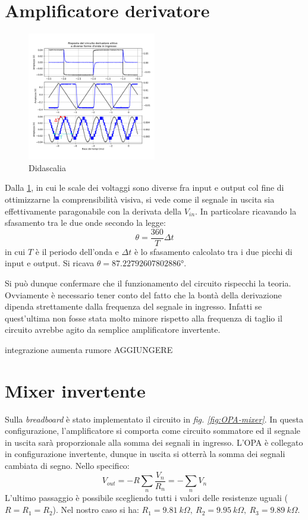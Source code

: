 \documentclass[journal]{IEEEtran}
\begin{document}
\section{Amplificatore derivatore} %
\begin{figure}[H]%
\begin {center}
\includegraphics[width=0.50\textwidth]{analysis/output/OPA-differentiator.pdf}
\caption{Didascalia}
\label{fig:derivatore}
\end {center}
\end{figure}
Dalla \ref{fig:derivatore}, in cui le scale dei voltaggi sono diverse fra input e output col fine di ottimizzarne la comprensibilità visiva, si vede come il segnale in uscita sia effettivamente paragonabile con la derivata della $V_{in}$. In particolare ricavando la sfasamento tra le due onde secondo la legge:
\[\theta = \frac{360}{T}\Delta t\]
in cui $T$ è il periodo dell'onda e $\Delta t$ è lo sfasamento calcolato tra i due picchi di input e output. Si ricava $\theta = 87.22792607802886 °$.

Si può dunque confermare che il funzionamento del circuito rispecchi la teoria. Ovviamente è necessario tener conto del fatto che la bontà della derivazione dipenda strettamente dalla frequenza del segnale in ingresso. Infatti se quest'ultima non fosse stata molto minore rispetto alla frequenza di taglio il circuito avrebbe agito da semplice amplificatore invertente.

integrazione aumenta rumore AGGIUNGERE


\section{Mixer invertente} %
Sulla \textit{breadboard} è stato implementato il circuito in \textit{fig. \ref{fig:OPA-mixer}}. In questa configurazione, l'amplificatore si comporta come circuito sommatore ed il segnale in uscita sarà proporzionale alla somma dei segnali in ingresso. L'OPA è collegato in configurazione invertente, dunque in uscita si otterrà la somma dei segnali cambiata di segno. Nello specifico: 
\[V_{out} = - R  \sum_{n} \frac{V_n}{R_n} = - \sum_{n} V_n \tag{1} \] L'ultimo passaggio è possibile scegliendo tutti i valori delle resistenze uguali ($R = R_1 = R_2$). Nel nostro caso si ha: $R_1 =9.81\ k\Omega, \ R_2 = 9.95\ k\Omega ,\ R_3 = 9.89\ k\Omega$.
\end{document}
